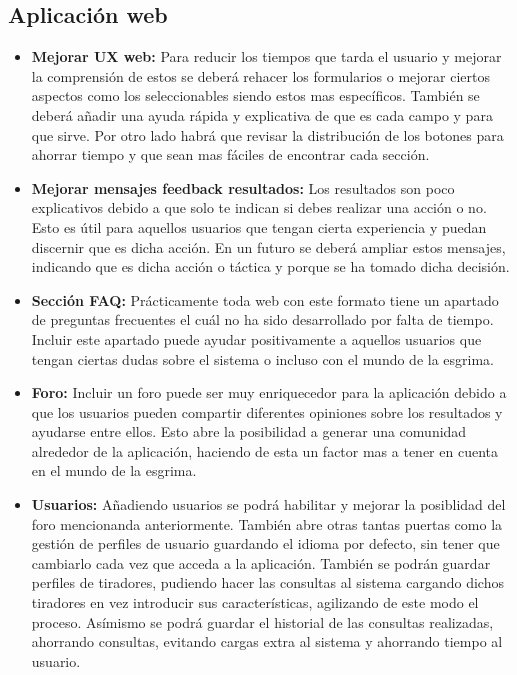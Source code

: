 \subsection{Aplicación web}
\begin{itemize}
  \item \textbf{Mejorar UX web:} Para reducir los tiempos que tarda el usuario y mejorar
    la comprensión de estos se deberá rehacer los formularios o mejorar ciertos aspectos
    como los seleccionables siendo estos mas específicos. También se deberá añadir una
    ayuda rápida y explicativa de que es cada campo y para que sirve. Por otro lado
    habrá que revisar la distribución de los botones para ahorrar tiempo y que sean mas
    fáciles de encontrar cada sección.
  \item \textbf{Mejorar mensajes feedback resultados:} Los resultados son poco explicativos
    debido a que solo te indican si debes realizar una acción o no. Esto es útil para aquellos
    usuarios que tengan cierta experiencia y puedan discernir que es dicha acción. En un futuro
    se deberá ampliar estos mensajes, indicando que es dicha acción o táctica y porque se ha
    tomado dicha decisión.
  \item \textbf{Sección FAQ:} Prácticamente toda web con este formato tiene un apartado de
    preguntas frecuentes el cuál no ha sido desarrollado por falta de tiempo. Incluir este apartado
    puede ayudar positivamente a aquellos usuarios que tengan ciertas dudas sobre el sistema
    o incluso con el mundo de la esgrima.
  \item \textbf{Foro:} Incluir un foro puede ser muy enriquecedor para la aplicación debido a que
    los usuarios pueden compartir diferentes opiniones sobre los resultados y ayudarse entre ellos.
    Esto abre la posibilidad a generar una comunidad alrededor de la aplicación, haciendo de esta
    un factor mas a tener en cuenta en el mundo de la esgrima.
  \item \textbf{Usuarios:} Añadiendo usuarios se podrá habilitar y mejorar la posiblidad del foro
    mencionanda anteriormente. También abre otras tantas puertas como la gestión de perfiles de usuario
    guardando el idioma por defecto, sin tener que cambiarlo cada vez que acceda a la aplicación.
    También se podrán guardar perfiles de tiradores, pudiendo hacer las consultas al sistema
    cargando dichos tiradores en vez introducir sus características, agilizando de este modo
    el proceso. Asímismo se podrá guardar el historial de las consultas realizadas, ahorrando
    consultas, evitando cargas extra al sistema y ahorrando tiempo al usuario.

\end{itemize}
